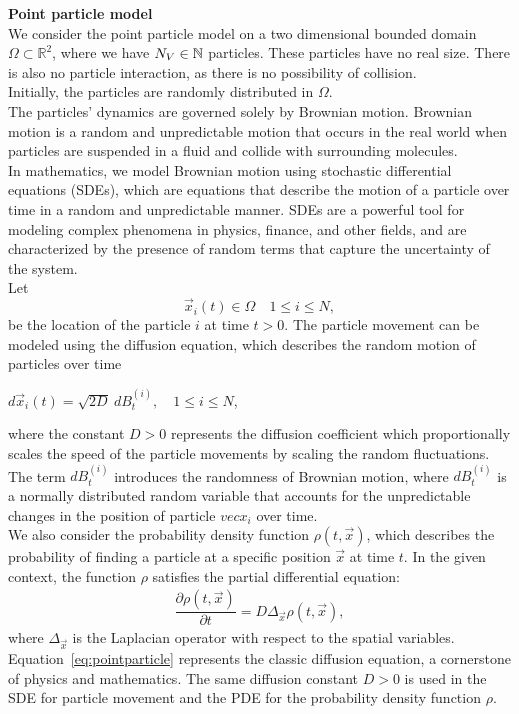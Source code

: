 \textbf{Point particle model} \\
We consider the point particle model on a two dimensional bounded domain $\Omega \subset \mathbb{R}^2$, where we have $N_V \in \mathbb{N}$ particles.
These particles have no real size.
There is also no particle interaction, as there is no possibility of collision. \\
Initially, the particles are randomly distributed in $\Omega$. \\
The particles' dynamics are governed solely by Brownian motion.
Brownian motion is a random and unpredictable motion that occurs in the real world when particles are suspended in a fluid and collide with surrounding molecules. \\
In mathematics, we model Brownian motion using stochastic differential equations (SDEs), which are equations that describe the motion of a particle over time in a random and unpredictable manner. 
SDEs are a powerful tool for modeling complex phenomena in physics, finance, and other fields, and are characterized by the presence of random terms that capture the uncertainty of the system. \\
Let 
\[\vec{x}_i(t) \in \Omega \quad 1 \leq i \leq N,\]
be the location of the particle $i$ at time $t > 0$. 
The particle movement can be modeled using the diffusion equation, which describes the random motion of particles over time
\begin{center}
	$d\vec{x}_i(t) = \sqrt{2D} \: dB_t^{(i)}, \quad 1 \leq i \leq N$,
\end{center}
where the constant $D > 0$ represents the diffusion coefficient which proportionally scales the speed of the particle movements by scaling the random fluctuations.
The term $dB_t^{(i)}$ introduces the randomness of Brownian motion, where $dB_t^{(i)}$ is a normally distributed random variable that accounts for the unpredictable changes in the position of particle $vec{x}_i$ over time. \\
We also consider the probability density function $\rho(t, \vec{x})$, which describes the probability of finding a particle at a specific position $\vec{x}$ at time $t$.
In the given context, the function $\rho$ satisfies the partial differential equation:
\begin{align}
	\dfrac{\partial \rho (t, \vec{x})}{\partial t} = D \Delta_{\vec{x}} \rho(t, \vec{x}) \label{eq:pointparticle}, 
\end{align}
where $\Delta_{\vec{x}}$ is the Laplacian operator with respect to the spatial variables. \\
Equation~\eqref{eq:pointparticle} represents the classic diffusion equation, a cornerstone of physics and mathematics.
The same diffusion constant $D>0$ is used in the SDE for particle movement and the PDE for the probability density function $\rho$. \\



